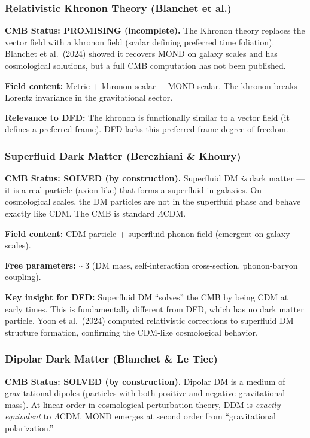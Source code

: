 \documentclass[11pt,a4paper]{article}
\begin{document}
\subsubsection{Relativistic Khronon Theory (Blanchet et al.)}

\textbf{CMB Status: PROMISING (incomplete).} The Khronon theory replaces the vector field with a khronon field (scalar defining preferred time foliation). Blanchet et al.\ (2024) showed it recovers MOND on galaxy scales and has cosmological solutions, but a full CMB computation has not been published.

\textbf{Field content:} Metric + khronon scalar + MOND scalar. The khronon breaks Lorentz invariance in the gravitational sector.

\textbf{Relevance to DFD:} The khronon is functionally similar to a vector field (it defines a preferred frame). DFD lacks this preferred-frame degree of freedom.

\subsubsection{Superfluid Dark Matter (Berezhiani \& Khoury)}

\textbf{CMB Status: SOLVED (by construction).} Superfluid DM \emph{is} dark matter --- it is a real particle (axion-like) that forms a superfluid in galaxies. On cosmological scales, the DM particles are not in the superfluid phase and behave exactly like CDM. The CMB is standard $\Lambda$CDM.

\textbf{Field content:} CDM particle + superfluid phonon field (emergent on galaxy scales).

\textbf{Free parameters:} $\sim$3 (DM mass, self-interaction cross-section, phonon-baryon coupling).

\textbf{Key insight for DFD:} Superfluid DM ``solves'' the CMB by being CDM at early times. This is fundamentally different from DFD, which has no dark matter particle. Yoon et al.\ (2024) computed relativistic corrections to superfluid DM structure formation, confirming the CDM-like cosmological behavior.

\subsubsection{Dipolar Dark Matter (Blanchet \& Le Tiec)}

\textbf{CMB Status: SOLVED (by construction).} Dipolar DM is a medium of gravitational dipoles (particles with both positive and negative gravitational mass). At linear order in cosmological perturbation theory, DDM is \emph{exactly equivalent} to $\Lambda$CDM. MOND emerges at second order from ``gravitational polarization.''
\end{document}
